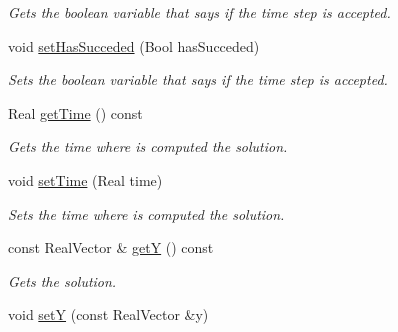 \begin{DoxyCompactItemize}
\begin{DoxyCompactList}\small\item\em Gets the boolean variable that says if the time step is accepted. \item\end{DoxyCompactList}\item 
\hypertarget{classMultiRateTRBDF2SolverData_aea944caae448918e895d7a70e45654d0}{
void \hyperlink{classMultiRateTRBDF2SolverData_aea944caae448918e895d7a70e45654d0}{setHasSucceded} (Bool hasSucceded)}
\label{classMultiRateTRBDF2SolverData_aea944caae448918e895d7a70e45654d0}

\begin{DoxyCompactList}\small\item\em Sets the boolean variable that says if the time step is accepted. \item\end{DoxyCompactList}\item 
\hypertarget{classMultiRateTRBDF2SolverData_aa6a3f6cd8e12b7ab453c9a799895c21f}{
Real \hyperlink{classMultiRateTRBDF2SolverData_aa6a3f6cd8e12b7ab453c9a799895c21f}{getTime} () const }
\label{classMultiRateTRBDF2SolverData_aa6a3f6cd8e12b7ab453c9a799895c21f}

\begin{DoxyCompactList}\small\item\em Gets the time where is computed the solution. \item\end{DoxyCompactList}\item 
\hypertarget{classMultiRateTRBDF2SolverData_a17fe220be0669beab144a72122518147}{
void \hyperlink{classMultiRateTRBDF2SolverData_a17fe220be0669beab144a72122518147}{setTime} (Real time)}
\label{classMultiRateTRBDF2SolverData_a17fe220be0669beab144a72122518147}

\begin{DoxyCompactList}\small\item\em Sets the time where is computed the solution. \item\end{DoxyCompactList}\item 
\hypertarget{classMultiRateTRBDF2SolverData_aa3c3459d54c5f0e2c1236062ec0d422a}{
const RealVector \& \hyperlink{classMultiRateTRBDF2SolverData_aa3c3459d54c5f0e2c1236062ec0d422a}{getY} () const }
\label{classMultiRateTRBDF2SolverData_aa3c3459d54c5f0e2c1236062ec0d422a}

\begin{DoxyCompactList}\small\item\em Gets the solution. \item\end{DoxyCompactList}\item 
\hypertarget{classMultiRateTRBDF2SolverData_af1233e2d355383e2ccf14341a6c690d7}{
void \hyperlink{classMultiRateTRBDF2SolverData_af1233e2d355383e2ccf14341a6c690d7}{setY} (const RealVector \&y)}
\label{classMultiRateTRBDF2SolverData_af1233e2d355383e2ccf14341a6c690d7}


\end{DoxyCompactItemize}
